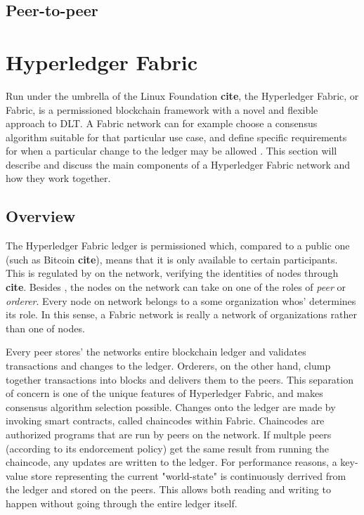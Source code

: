 \documentclass[english, biblatex, digitaloutput]{kththesis}
\begin{document}

\subsection{Peer-to-peer}




\section{Hyperledger Fabric}

Run under the umbrella of the Linux Foundation \textbf{cite}, the Hyperledger Fabric, or Fabric, is a permissioned blockchain framework with a novel and flexible approach to \gls{DLT}. A Fabric network can for example choose a consensus algorithm suitable for that particular use case, and define specific requirements for when a particular change to the ledger may be allowed \cite{androulaki_hyperledger_2018}. This section will describe and discuss the main components of a Hyperledger Fabric network and how they work together.

\subsection{Overview}

The Hyperledger Fabric ledger is permissioned which, compared to a public one (such as Bitcoin \textbf{cite}), means that it is only available to certain participants. This is regulated by  on the network, verifying the identities of nodes through  \textbf{cite}. Besides , the nodes on the network can take on one of the roles of \textit{peer} or \textit{orderer}. Every node on network belongs to a some organization whos'  determines its role. In this sense, a Fabric network is really a network of organizations rather than one of nodes.

Every peer stores' the networks entire blockchain ledger and validates transactions and changes to the ledger. Orderers, on the other hand, clump together transactions into blocks and delivers them to the peers. This separation of concern is one of the unique features of Hyperledger Fabric, and makes consensus algorithm selection possible. Changes onto the ledger are made by invoking smart contracts, called chaincodes within Fabric. Chaincodes are authorized programs that are run by peers on the network. If multple peers (according to its endorcement policy) get the same result from running the chaincode, any updates are written to the ledger. For performance reasons, a key-value store representing the current "world-state" is continuously derrived from the ledger and stored on the peers. This allows both reading and writing to happen without going through the entire ledger itself.
\end{document}
